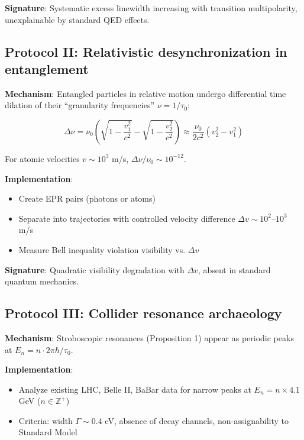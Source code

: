 \documentclass[11pt,a4paper]{article}
\begin{document}
\textbf{Signature}: Systematic excess linewidth increasing with transition multipolarity, unexplainable by standard QED effects.

\subsection{Protocol II: Relativistic desynchronization in entanglement}

\textbf{Mechanism}: Entangled particles in relative motion undergo differential time dilation of their ``granularity frequencies'' $\nu = 1/\tau_0$:

\begin{equation}\label{eq:granularity_dilation}
\Delta\nu = \nu_0 \left( \sqrt{1-\frac{v_1^2}{c^2}} - \sqrt{1-\frac{v_2^2}{c^2}} \right) \approx \frac{\nu_0}{2c^2}(v_2^2 - v_1^2)
\end{equation}

For atomic velocities $v \sim 10^3$ m/s, $\Delta\nu/\nu_0 \sim 10^{-12}$.

\textbf{Implementation}:
\begin{itemize}[leftmargin=*]
    \item Create EPR pairs (photons or atoms)
    \item Separate into trajectories with controlled velocity difference $\Delta v \sim 10^2$--$10^3$ m/s
    \item Measure Bell inequality violation visibility vs. $\Delta v$
\end{itemize}

\textbf{Signature}: Quadratic visibility degradation with $\Delta v$, absent in standard quantum mechanics.

\subsection{Protocol III: Collider resonance archaeology}

\textbf{Mechanism}: Stroboscopic resonances (Proposition 1) appear as periodic peaks at $E_n = n \cdot 2\pi\hbar/\tau_0$.

\textbf{Implementation}:
\begin{itemize}[leftmargin=*]
    \item Analyze existing LHC, Belle II, BaBar data for narrow peaks at $E_n = n \times 4.1$ GeV ($n \in \mathbb{Z}^+$)
    \item Criteria: width $\Gamma \sim 0.4$ eV, absence of decay channels, non-assignability to Standard Model
\end{itemize}
\end{document}
